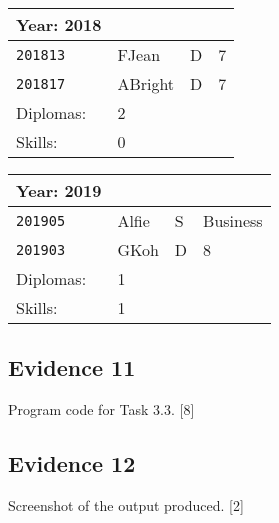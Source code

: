 \noindent \begin{center}
\begin{tabular}{llll}
Year: 2018 &  &  & \tabularnewline
\hline 
\texttt{201813} & FJean & D & 7\tabularnewline
\texttt{201817} & ABright & D & 7\tabularnewline
Diplomas: & 2 &  & \tabularnewline
Skills: & 0 &  & \tabularnewline
\end{tabular}
\par\end{center}

\noindent \begin{center}
\begin{tabular}{llll}
Year: 2019 &  &  & \tabularnewline
\hline 
\texttt{201905} & Alfie & S & Business\tabularnewline
\texttt{201903} & GKoh & D & 8\tabularnewline
Diplomas: & 1 &  & \tabularnewline
Skills: & 1 &  & \tabularnewline
\end{tabular}
\par\end{center}

\subsection*{Evidence 11 }

Program code for Task 3.3. \hfill{}{[}8{]}

\subsection*{Evidence 12 }

Screenshot of the output produced.\hfill{} {[}2{]}